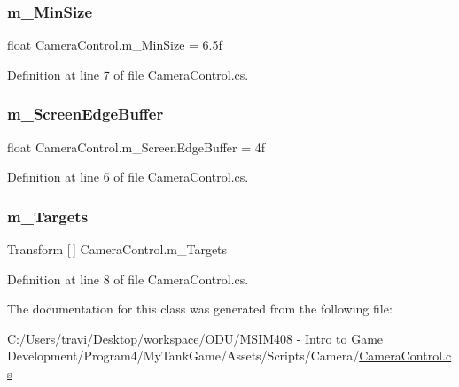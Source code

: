 \subsubsection{\texorpdfstring{m\+\_\+\+Min\+Size}{m\_MinSize}}
{\footnotesize\ttfamily float Camera\+Control.\+m\+\_\+\+Min\+Size = 6.\+5f}



Definition at line 7 of file Camera\+Control.\+cs.

\mbox{\label{class_camera_control_aabb1255be1a2f913fd69db9c75d3be5d}} 
\subsubsection{\texorpdfstring{m\+\_\+\+Screen\+Edge\+Buffer}{m\_ScreenEdgeBuffer}}
{\footnotesize\ttfamily float Camera\+Control.\+m\+\_\+\+Screen\+Edge\+Buffer = 4f}



Definition at line 6 of file Camera\+Control.\+cs.

\mbox{\label{class_camera_control_af7c531a124be556f16f7b531ec588037}} 
\subsubsection{\texorpdfstring{m\+\_\+\+Targets}{m\_Targets}}
{\footnotesize\ttfamily Transform \mbox{[}$\,$\mbox{]} Camera\+Control.\+m\+\_\+\+Targets}



Definition at line 8 of file Camera\+Control.\+cs.



The documentation for this class was generated from the following file\+:\begin{DoxyCompactItemize}
\item 
C\+:/\+Users/travi/\+Desktop/workspace/\+O\+D\+U/\+M\+S\+I\+M408 -\/ Intro to Game Development/\+Program4/\+My\+Tank\+Game/\+Assets/\+Scripts/\+Camera/\hyperlink{_camera_control_8cs}{Camera\+Control.\+cs}\end{DoxyCompactItemize}
